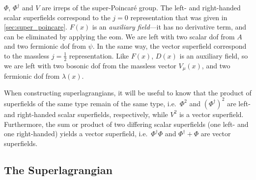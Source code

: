 $\Phi$, $\Phi^\dagger$ and $V$ are \glspl{irrep} of the super-Poincar\'e group.
The left- and right-handed scalar superfields correspond to the $j=0$ representation that was given in \cref{sec:super_poincare}.
$F(x)$ is an \emph{auxiliary field}---it has no derivative term, and can be eliminated by applying the \gls{eom}. We are left with two scalar \gls{dof} from $A$ and two fermionic \gls{dof} from $\psi$.
In the same way, the vector superfield correspond to the massless $j=\frac{1}{2}$ representation.
Like $F(x)$, $D(x)$ is an auxiliary field, so we are left with two bosonic \gls{dof} from the massless vector $V_\mu(x)$, and two fermionic \gls{dof} from $\lambda(x)$.

When constructing superlagrangians, it will be useful to know that the product of superfields of the same type remain of the same type, i.e.\ $\Phi^2$ and $(\Phi^\dagger)^2$ are left- and right-handed scalar superfields, respectively, while $V^2$ is a vector superfield.
Furthermore, the sum or product of two differing scalar superfields (one left- and one right-handed) yields a vector superfield, i.e.\ $\Phi^\dagger\Phi$ and $\Phi^\dagger+\Phi$ are vector superfields.


\subsection{The Superlagrangian}

